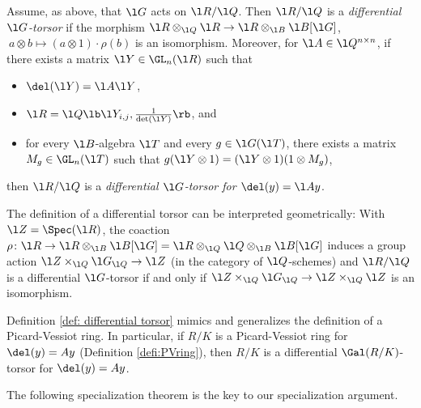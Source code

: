\documentclass[a4paper, 11pt]{article}
\begin{document}
\begin{definition} \label{def: differential torsor}
Assume, as above, that $\l G$ acts on $\l R / \l Q$. Then $\l R / \l Q$ is a \emph{differential $\l G$-torsor} if the morphism $\l R \otimes_{\l Q} \l R \to \l R \otimes_{\l B} \l B[\l G]$, $\ a \otimes b \mapsto (a \otimes 1) \cdot \rho(b)$ is an isomorphism. Moreover, for $\l A \in \l Q^{n \times n}$, if there exists a matrix $\l Y \in \GL_n(\l R)$ such that
	\begin{itemize}
		\item $\del(\l Y) = \l A \l Y$,
		\item $\l R = \l Q\lb \l Y_{i,j}, \frac{1}{\det(\l Y)}\rb$, and
		\item for every $\l B$-algebra $\l T$ and every $g \in \l G(\l T)$, there exists a matrix $M_g \in \GL_n(\l T)$ such that $g(\l Y \otimes 1) = (\l Y \otimes 1)(1 \otimes M_g)$,
	\end{itemize}
	 then $\l R / \l Q$ is a \emph{differential $\l G$-torsor for $\del(y) = \l Ay$}.
\end{definition}

The definition of a differential torsor can be interpreted geometrically: With $\l Z = \Spec(\l R)$, the coaction $\rho\colon \l R \to \l R \otimes_{\l B} \l B[\l G]=\l R\otimes_{\l Q}\l Q\otimes_{\l B }\l B[\l G]$ induces a group action $\l Z \times_{\l Q} \l G_{\l Q} \to \l Z$ (in the category of $\l Q$-schemes) and $\l R/\l Q$ is a differential $\l G$-torsor if and only if $\l Z \times_{\l Q} \l G_{\l Q} \to \l Z \times_{\l Q} \l Z$ is an isomorphism.

Definition \ref{def: differential torsor} mimics and generalizes the definition of a Picard-Vessiot ring.
In particular, if $R/K$ is a Picard-Vessiot ring for $\del(y)=Ay$ (Definition \ref{defi:PVring}), then $R/K$ is a 
differential $\Gal(R/K)$-torsor for $\del(y) = A y$.


The following specialization theorem is the key to our specialization argument.
\end{document}
